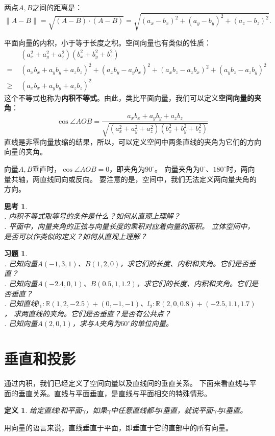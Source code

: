 \documentclass[12pt,UTF8]{ctexbook}
\newtheorem{df}{定义}[section]
\newtheorem{sk}{思考}[section]
\newtheorem{xt}{习题}[section]
\begin{document}
两点$A,B$之间的距离是：
$$\|A-B\| = \sqrt{(A - B)\cdot(A-B)} = \sqrt{(a_x - b_x)^2 + (a_y-b_y)^2 + (a_z-b_z)^2}. $$

平面向量的内积，小于等于长度之积。空间向量也有类似的性质：
\begin{align*}
    &(a_x^2 + a_y^2 + a_z^2)(b_x^2 + b_y^2 + b_z^2)  \\
    =\,\,& (a_xb_x + a_yb_y + a_zb_z)^2 + (a_xb_y - a_yb_x)^2 + (a_xb_z - a_zb_x)^2 + (a_yb_z - a_zb_y)^2  \\
    \geqslant\,\,& (a_xb_x + a_yb_y + a_zb_z)^2  
\end{align*}
这个不等式也称为\textbf{内积不等式}。由此，类比平面向量，我们可以定义\textbf{空间向量的夹角}：
$$ \cos \angle AOB = \frac{a_xb_x + a_yb_y + a_zb_z}{\sqrt{(a_x^2 + a_y^2 + a_z^2)(b_x^2 + b_y^2 + b_z^2)}}$$
直线是非零向量放缩的结果，所以，可以定义空间中两条直线的夹角为它们的方向向量的夹角。

向量$A,B$垂直时，$\cos \angle AOB = 0$，即夹角为$90^\circ$。
向量夹角为$0^\circ$、$180^\circ$时，两向量共轴，两直线同向或反向。
要注意的是，空间中，我们无法定义两向量夹角的方向。

\begin{sk}
    \mbox{} \\
    . 内积不等式取等号的条件是什么？如何从直观上理解？\\
    . 平面中，向量夹角的正弦与向量长度的乘积对应着向量的面积。
    立体空间中，是否可以作类似的定义？如何从直观上理解？
\end{sk}

\begin{xt}
    \mbox{} \\
    . 已知向量$A(-1, 3, 1)$、$B(1, 2, 0)$，求它们的长度、内积和夹角。它们是否垂直？\\
    . 已知向量$A(-2.4, 0, 1)$、$B(0.5, 1, 1.2)$，求它们的长度、内积和夹角。它们是否垂直？\\
    . 已知直线$l_1: \mathbb{R}(1,2,-2.5) + (0,-1,-1)$、$l_2: \mathbb{R}(2,0,0.8) + (-2.5,1.1,1.7)$，
    求两直线的夹角。它们是否垂直？是否有公共点？\\
    . 已知向量$A(2, 0, 1)$，求与$A$夹角为$60^\circ$的单位向量。
\end{xt}

\section{垂直和投影}

通过内积，我们已经定义了空间向量以及直线间的垂直关系。
下面来看直线与平面的垂直关系。直线与平面垂直，是直线与平面相交的特殊情形。
\begin{df}\label{df:1-3-10}
    给定直线$l$和平面$\gamma$，如果$\gamma$中任意直线都与$l$垂直，就说平面$\gamma$与$l$垂直。
\end{df}
用向量的语言来说，直线垂直于平面，即垂直于它的直部中的所有向量。
\end{document}
